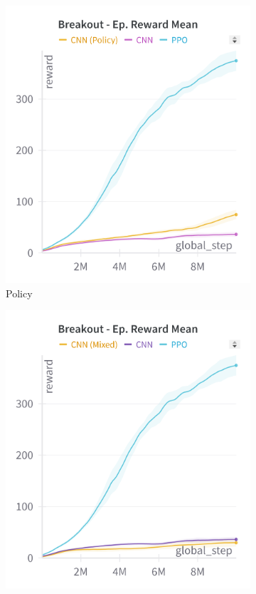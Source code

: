 \begin{figure}[ht]
    \centering
    \begin{subfigure}[b]{0.32\textwidth}
        \centering
        \includegraphics[width=\textwidth]{images/breakout_cnn_policy}
        \caption{Policy}
        \label{fig:breakout_cnn_policy}
    \end{subfigure}
    \hfill
    \begin{subfigure}[b]{0.32\textwidth}
        \centering
        \includegraphics[width=\textwidth]{images/breakout_cnn_mixed}

\end{subfigure}
\end{figure}
